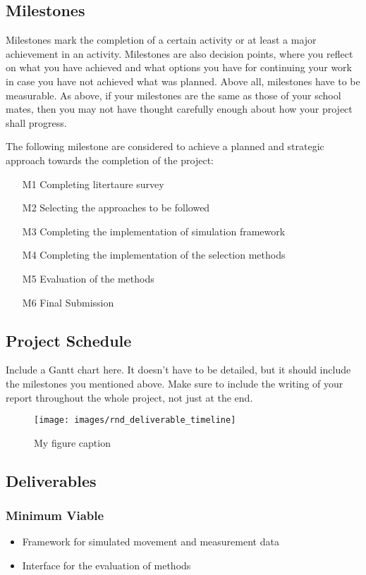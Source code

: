 \documentclass[rnd]{mas_proposal}
\begin{document}
\subsection{Milestones}
Milestones mark the completion of a certain activity or at least a major achievement in an activity. Milestones are also decision points, where you reflect on what you have achieved and what options you have for continuing your work in case you have not achieved what was planned. Above all, milestones have to be measurable. As above, if your milestones are the same as those of your school mates, then you may not have thought carefully enough about how your project shall progress.

The following milestone are considered to achieve a planned and strategic approach towards the completion of the project:
\begin{enumerate}
    \item[M1] Completing litertaure survey
    \item[M2] Selecting the approaches to be followed
    \item[M3] Completing the implementation of simulation framework
    \item[M4] Completing the implementation of the selection methods
    \item[M5] Evaluation of the methods
    \item[M6] Final Submission
\end{enumerate}

\subsection{Project Schedule}
Include a Gantt chart here. It doesn't have to be detailed, but it should include the milestones you mentioned above.
Make sure to include the writing of your report throughout the whole project, not just at the end.

\begin{figure}[h!]
    \texttt{[image: images/rnd\_deliverable\_timeline]}
    \caption{My figure caption}
    \label{fig:myfigure}
\end{figure}

\subsection{Deliverables}

\subsubsection*{Minimum Viable}
\begin{itemize}
    \item Framework for simulated movement and measurement data
    \item Interface for the evaluation of methods
\end{itemize}
\end{document}
